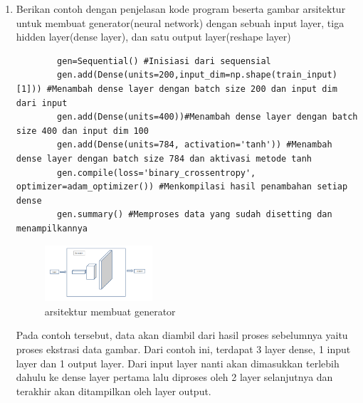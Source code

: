 \begin{enumerate}
    \item Berikan contoh dengan penjelasan kode program beserta gambar arsitektur untuk membuat generator(neural network) dengan sebuah input layer, tiga hidden layer(dense layer), dan satu output layer(reshape layer)
    \hfill\break
    \begin{verbatim}
        gen=Sequential() #Inisiasi dari sequensial
        gen.add(Dense(units=200,input_dim=np.shape(train_input)[1])) #Menambah dense layer dengan batch size 200 dan input dim dari input
        gen.add(Dense(units=400))#Menambah dense layer dengan batch size 400 dan input dim 100
        gen.add(Dense(units=784, activation='tanh')) #Menambah dense layer dengan batch size 784 dan aktivasi metode tanh
        gen.compile(loss='binary_crossentropy', optimizer=adam_optimizer()) #Menkompilasi hasil penambahan setiap dense
        gen.summary() #Memproses data yang sudah disetting dan menampilkannya
    \end{verbatim}
    \begin{figure}[H]
	    \centering
	    \includegraphics[width=4cm]{figures/1174096/tugas8/t9.PNG}
	    \caption{arsitektur membuat generator}
    \end{figure}
    Pada contoh tersebut, data akan diambil dari hasil proses sebelumnya yaitu proses ekstrasi data gambar. Dari contoh ini, terdapat 3 layer dense, 1 input layer dan 1 output layer. Dari input layer nanti akan dimasukkan terlebih dahulu ke dense layer pertama lalu diproses oleh 2 layer selanjutnya dan terakhir akan ditampilkan oleh layer output.


\end{enumerate}
